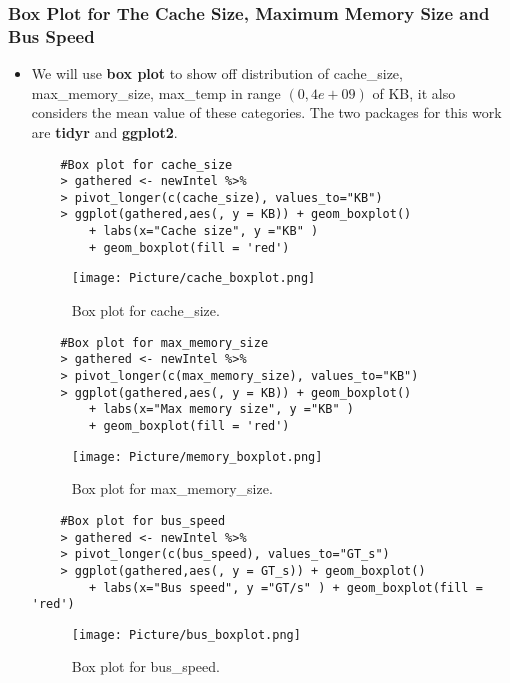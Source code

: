 \documentclass[a4paper]{article}
\begin{document}
\subsubsection{Box Plot for The Cache Size, Maximum Memory Size and Bus Speed}
\begin{itemize}
    
    \item[] We will use \textbf{box plot} to show off distribution of cache\_size, max\_memory\_size, max\_temp in range $(0, 4e+09)$ of KB, it also considers the mean value of these categories. The two packages for this work are \textbf{tidyr} and \textbf{ggplot2}.


    \begin{lstlisting}
    #Box plot for cache_size
    > gathered <- newIntel %>%
    > pivot_longer(c(cache_size), values_to="KB")
    > ggplot(gathered,aes(, y = KB)) + geom_boxplot() 
        + labs(x="Cache size", y ="KB" ) 
        + geom_boxplot(fill = 'red')
    \end{lstlisting}

     \begin{figure}[H]
        \centering
        \texttt{[image: Picture/cache\_boxplot.png]}
        \caption{Box plot for cache\_size.}
        \label{5.3.3.2}
    \end{figure}
    
    \begin{lstlisting}
    #Box plot for max_memory_size
    > gathered <- newIntel %>%
    > pivot_longer(c(max_memory_size), values_to="KB")
    > ggplot(gathered,aes(, y = KB)) + geom_boxplot() 
        + labs(x="Max memory size", y ="KB" ) 
        + geom_boxplot(fill = 'red')
    \end{lstlisting}
    
        
    \begin{figure}[H]
        \centering
        \texttt{[image: Picture/memory\_boxplot.png]}
        \caption{Box plot for  max\_memory\_size.}
        \label{5.3.3.2}
    \end{figure}
    \newpage
    
     \begin{lstlisting}
    #Box plot for bus_speed
    > gathered <- newIntel %>%
    > pivot_longer(c(bus_speed), values_to="GT_s")
    > ggplot(gathered,aes(, y = GT_s)) + geom_boxplot() 
        + labs(x="Bus speed", y ="GT/s" ) + geom_boxplot(fill = 'red')
    \end{lstlisting}
    
        
    \begin{figure}[H]
        \centering
        \texttt{[image: Picture/bus\_boxplot.png]}
        \caption{Box plot for bus\_speed.}
        \label{5.3.3.2}
    \end{figure}
\end{itemize}
\end{document}
